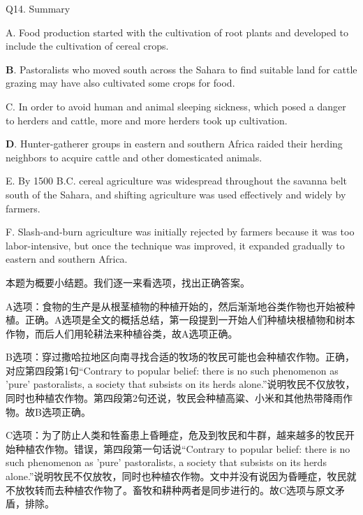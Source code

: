\begin{blk}
    \begin{qst}
        Q14. Summary
    \end{qst}

    \begin{chc}
        A. Food production started with the cultivation of root plants and developed to include the cultivation of cereal crops.

        \textbf{B}. Pastoralists who moved south across the Sahara to find suitable land for cattle grazing may have also cultivated some crops for food.

        C. In order to avoid human and animal sleeping sickness, which posed a danger to herders and cattle, more and more herders took up cultivation.

        \textbf{D}. Hunter-gatherer groups in eastern and southern Africa raided their herding neighbors to acquire cattle and other domesticated animals.

        E. By 1500 B.C. cereal agriculture was widespread throughout the savanna belt south of the Sahara, and shifting agriculture was used effectively and widely by farmers.

        F. Slash-and-burn agriculture was initially rejected by farmers because it was too labor-intensive, but once the technique was improved, it expanded gradually to eastern and southern Africa.
    \end{chc}

    \begin{nlz}
        本题为概要小结题。我们逐一来看选项，找出正确答案。

        A选项：食物的生产是从根茎植物的种植开始的，然后渐渐地谷类作物也开始被种植。正确。A选项是全文的概括总结，第一段提到一开始人们种植块根植物和树本作物，而后人们用轮耕法来种植谷类，故A选项正确。

        B选项：穿过撒哈拉地区向南寻找合适的牧场的牧民可能也会种植农作物。正确，对应第四段第1句“Contrary to popular belief: there is no such phenomenon as 'pure' pastoralists, a society that subsists on its herds alone.”说明牧民不仅放牧，同时也种植农作物。第四段第2句还说，牧民会种植高粱、小米和其他热带降雨作物。故B选项正确。

        C选项：为了防止人类和牲畜患上昏睡症，危及到牧民和牛群，越来越多的牧民开始种植农作物。错误，第四段第一句话说“Contrary to popular belief: there is no such phenomenon as 'pure' pastoralists, a society that subsists on its herds alone.”说明牧民不仅放牧，同时也种植农作物。文中并没有说因为昏睡症，牧民就不放牧转而去种植农作物了。畜牧和耕种两者是同步进行的。故C选项与原文矛盾，排除。


\end{nlz}
\end{blk}
